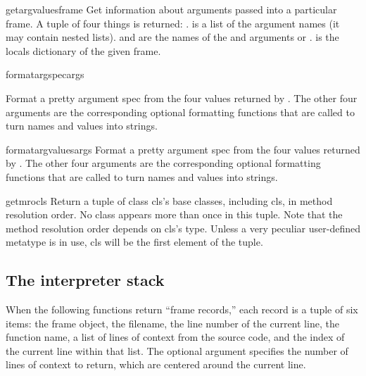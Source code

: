 \begin{funcdesc}{getargvalues}{frame}
  Get information about arguments passed into a particular frame.
  A tuple of four things is returned: .
   is a list of the argument names (it may contain nested
  lists).
   and  are the names of the \code{*} and
  \code{**} arguments or .
   is the locals dictionary of the given frame.
\end{funcdesc}

\begin{funcdesc}{formatargspec}{args}

  Format a pretty argument spec from the four values returned by
  .  The other four arguments are the
  corresponding optional formatting functions that are called to turn
  names and values into strings.
\end{funcdesc}

\begin{funcdesc}{formatargvalues}{args}
  Format a pretty argument spec from the four values returned by
  .  The other four arguments are the
  corresponding optional formatting functions that are called to turn
  names and values into strings.
\end{funcdesc}

\begin{funcdesc}{getmro}{cls}
  Return a tuple of class cls's base classes, including cls, in
  method resolution order.  No class appears more than once in this tuple.
  Note that the method resolution order depends on cls's type.  Unless a
  very peculiar user-defined metatype is in use, cls will be the first
  element of the tuple.
\end{funcdesc}

\subsection{The interpreter stack
            \label{inspect-stack}}

When the following functions return ``frame records,'' each record
is a tuple of six items: the frame object, the filename,
the line number of the current line, the function name, a list of
lines of context from the source code, and the index of the current
line within that list.
The optional  argument specifies the number of lines of
context to return, which are centered around the current line.

